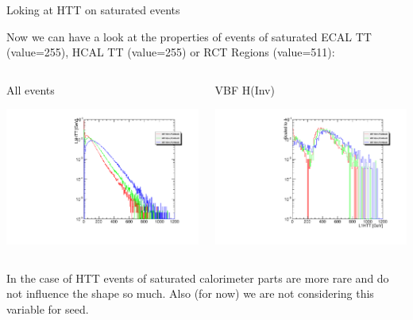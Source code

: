 \documentclass[8pt]{beamer}
\begin{document}
\begin{frame}{Loking at HTT on saturated events}

Now we can have a look at the properties of events of saturated ECAL TT (value=255), HCAL TT (value=255) or RCT Regions (value=511):

\begin{columns}
 
\begin{block}{All events}
\centering

\includegraphics[width=\linewidth]{fig/L1HTT_Sig.pdf}

\end{block}

\begin{block}{VBF H(Inv)}
\centering

\includegraphics[width=\linewidth]{fig/L1HTT_Saturated_Sig.pdf}

\end{block}

\end{columns}

In the case of HTT events of saturated calorimeter parts are more rare and do not influence the shape so much. Also (for now) we are not considering this variable for seed.

\end{frame}
\end{document}
